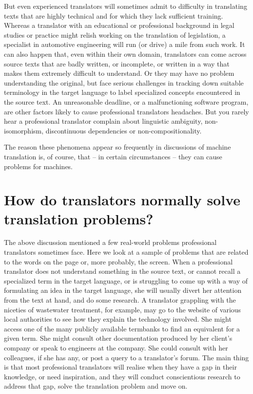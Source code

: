 \documentclass[output=paper]{langscibook}
\begin{document}
But even experienced translators will sometimes admit to difficulty in translating texts that are highly technical and for which they lack sufficient training. Whereas a translator with an educational or professional background in legal studies or practice might relish working on the translation of legislation, a specialist in automotive engineering will run (or drive) a mile from such work. It can also happen that, even within their own domain, translators can come across source texts that are badly written, or incomplete, or written in a way that makes them extremely difficult to understand. Or they may have no problem understanding the original, but face serious challenges in tracking down suitable terminology in the target language to label specialized concepts encountered in the source text. An unreasonable deadline, or a malfunctioning software program, are other factors likely to cause professional translators headaches. But you rarely hear a professional translator complain about linguistic ambiguity, non-isomorphism, discontinuous dependencies or non-compositionality.

The reason these phenomena appear so frequently in discussions of machine translation is, of course, that -- in certain circumstances -- they can cause problems for machines. 

\section{How do translators normally solve translation problems?}
The above discussion mentioned a few real-world problems professional translators sometimes face. Here we look at a sample of problems that are related to the words on the page or, more probably, the screen. When a professional translator does not understand something in the source text, or cannot recall a specialized term in the target language, or is struggling to come up with a way of formulating an idea in the target language, she will usually divert her attention from the text at hand, and do some research. A translator grappling with the niceties of wastewater treatment, for example, may go to the website of various local authorities to see how they explain the technology involved. She might access one of the many publicly available termbanks to find an equivalent for a given term. She might consult other documentation produced by her client's company or speak to engineers at the company. She could consult with her colleagues, if she has any, or post a query to a translator's forum. The main thing is that most professional translators will realise when they have a gap in their knowledge, or need inspiration, and they will conduct conscientious research to address that gap, solve the translation problem and move on.
\end{document}
